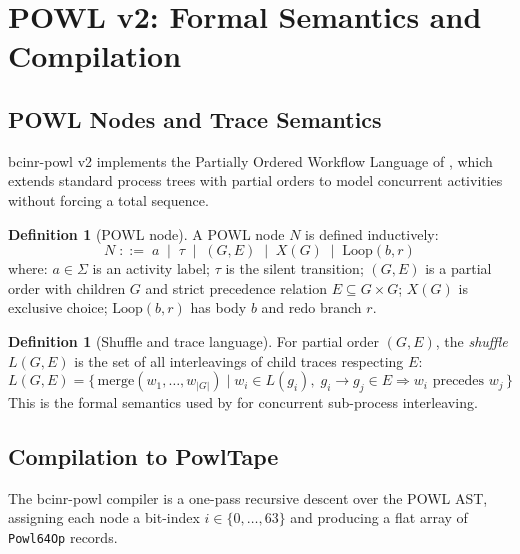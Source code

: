 \documentclass[12pt,a4paper]{article}
\theoremstyle{definition}
\newtheorem{definition}[theorem]{Definition}
\theoremstyle{remark}
\begin{document}
\section{POWL v2: Formal Semantics and Compilation}
\label{sec:powl}

\subsection{POWL Nodes and Trace Semantics}

bcinr-powl v2 implements the Partially Ordered Workflow Language of
\citet{kourani2023powl}, which extends standard process trees with partial
orders to model concurrent activities without forcing a total sequence.

\begin{definition}[POWL node]
\label{def:powlnode}
A POWL node $N$ is defined inductively:
\[
  N \;::=\; a \;\mid\; \tau \;\mid\; (G,E) \;\mid\; X(G) \;\mid\; \mathrm{Loop}(b,r)
\]
where:
$a \in \Sigma$ is an activity label;
$\tau$ is the silent transition;
$(G,E)$ is a partial order with children $G$ and strict precedence relation
$E \subseteq G \times G$;
$X(G)$ is exclusive choice;
$\mathrm{Loop}(b,r)$ has body $b$ and redo branch $r$.
\end{definition}

\begin{definition}[Shuffle and trace language]
For partial order $(G,E)$, the \emph{shuffle} $L(G,E)$ is the set of all
interleavings of child traces respecting $E$:
\[
  L(G,E) = \bigl\{\, \text{merge}(w_1,\ldots,w_{|G|})
  \;\big|\;
  w_i \in L(g_i),\;
  g_i \to g_j \in E \Rightarrow w_i \text{ precedes } w_j
  \,\bigr\}
\]
This is the formal semantics used by \citet{kourani2023powl} for concurrent
sub-process interleaving.
\end{definition}

\subsection{Compilation to PowlTape}

The bcinr-powl compiler is a one-pass recursive descent over the POWL AST,
assigning each node a bit-index $i \in \{0,\ldots,63\}$ and producing
a flat array of \texttt{Powl64Op} records.
\end{document}
